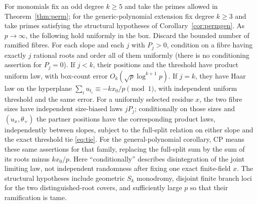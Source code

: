 \begin{theorem}\label{hyp:positions}
For monomials fix an odd degree $k\ge5$ and take the primes allowed in Theorem~\ref{thm:perm}; for the generic-polynomial extension fix degree $k\ge3$ and take primes satisfying the structural hypotheses of Corollary~\ref{cor:permgen}.  As $p\to\infty$, the following hold uniformly in the box.
Discard the bounded number of ramified fibres.  For each slope and each $j$ with $P_j>0$, condition on a fibre having exactly $j$ rational roots and order all of them uniformly (there is no conditioning assertion for $P_j=0$).
If $j<k$, their positions and the threshold have product uniform law, with box-count error $O_k(\sqrt p\log^{k+1}p)$.
If $j=k$, they have Haar law on the hyperplane $\sum_i u_{t_i}\equiv-kx_0/p\pmod1$, with independent uniform threshold and the same error.
For a uniformly selected residue $x$, the two fibre sizes have independent size-biased laws $jP_j$;
conditionally on those sizes and $(u_x,\theta_+)$ the partner positions have the corresponding product laws, independently between slopes,
subject to the full-split relation on either slope and the exact threshold tie \eqref{eq:tie}.
For the general-polynomial corollary, CP means these same assertions for that family, replacing the full-split sum by the sum of its roots minus $kx_0/p$.
Here ``conditionally'' describes disintegration of the joint limiting law, not independent randomness after fixing one exact finite-field $x$.
The structural hypotheses include geometric $S_k$ monodromy, disjoint finite branch loci for the two distinguished-root covers,
and sufficiently large $p$ so that their ramification is tame.
\end{theorem}
